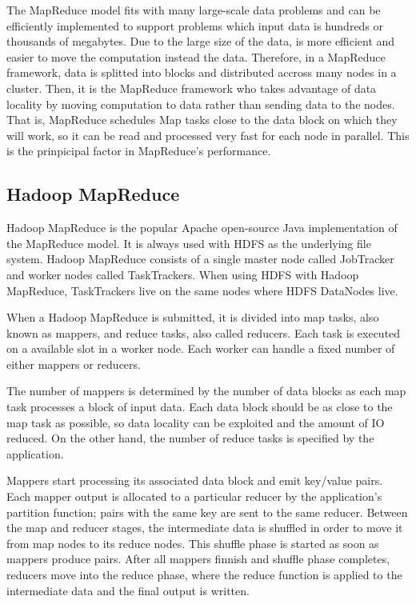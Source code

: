 The MapReduce model fits with many large-scale data problems and can be efficiently implemented to support problems which input data is hundreds or thousands of megabytes. Due to the large size of the data, is more efficient and easier to move the computation instead the data. Therefore, in a MapReduce framework, data is splitted into blocks and distributed accross many nodes in a cluster. Then, it is the MapReduce framework who takes advantage of data locality by moving computation to data rather than sending data to the nodes. That is, MapReduce schedules Map tasks close to the data block on which they will work, so it can be read and processed very fast for each node in parallel. This is the prinpicipal factor in MapReduce's performance.

\subsection{Hadoop MapReduce}


Hadoop MapReduce \cite{ApacheHadoop} \cite{white2012hadoop} is the popular Apache open-source Java implementation of the MapReduce model. It is always used with HDFS as the underlying file system. Hadoop MapReduce consists of a single master node called JobTracker and worker nodes called TaskTrackers. When using HDFS with Hadoop MapReduce, TaskTrackers live on the same nodes where HDFS DataNodes live.
\par
When a Hadoop MapReduce is submitted, it is divided into map tasks, also known as mappers, and reduce tasks, also called reducers. Each task is executed on a available slot in a worker node. Each worker can handle a fixed number of either mappers or reducers.
\par
The number of mappers is determined by the number of data blocks as each map task processes a block of input data. Each data block should be as close to the map task as possible, so data locality can be exploited and the amount of IO reduced. On the other hand, the number of reduce tasks is specified by the application.
\par
{}
\par
Mappers start processing its associated data block and emit key/value pairs. Each mapper output is allocated to a particular reducer by the application's partition function; pairs with the same key are sent to the same reducer. Between the map and reducer stages, the intermediate data is shuffled in order to move it from map nodes to its reduce nodes. This shuffle phase is started as soon as mappers produce pairs. After all mappers finnish and shuffle phase completes, reducers move into the reduce phase, where the reduce function is applied to the intermediate data and the final output is written.
\par





